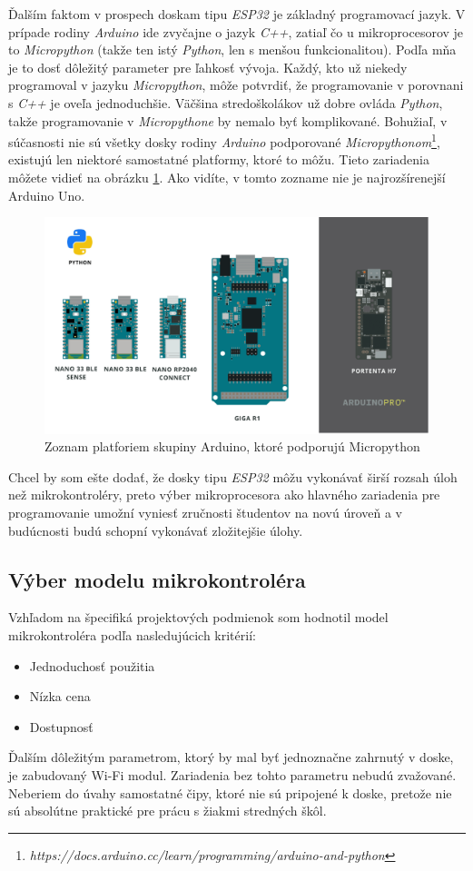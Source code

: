 Ďalším faktom v prospech doskam tipu \textit{ESP32} je základný programovací jazyk. V prípade rodiny \textit{Arduino} ide zvyčajne o jazyk \textit{C++}, zatiaľ čo u mikroprocesorov je to \textit{Micropython} (takže ten istý \textit{Python}, len s menšou funkcionalitou). Podľa mňa je to dosť dôležitý parameter pre ľahkosť vývoja. Každý, kto už niekedy programoval v jazyku \textit{Micropython}, môže potvrdiť, že programovanie v porovnani s \textit{C++} je oveľa jednoduchšie. Väčšina stredoškolákov už dobre ovláda \textit{Python}, takže programovanie v \textit{Micropythone} by nemalo byť komplikované. Bohužiaľ, v súčasnosti nie sú všetky dosky rodiny \textit{Arduino} podporované \textit{Micropythonom}\footnote{\textit{https://docs.arduino.cc/learn/programming/arduino-and-python}}, existujú len niektoré samostatné platformy, ktoré to môžu. Tieto zariadenia môžete vidieť na obrázku \ref{arduino}. Ako vidíte, v tomto zozname nie je najrozšírenejší Arduino Uno.
\begin{figure}[!ht]
    \centering
    \includegraphics[width=.9\textwidth]{figures/arduino.png}
    \caption{Zoznam platforiem skupiny Arduino, ktoré podporujú Micropython \label{arduino}\cite{arduinoPyt}}
\end{figure}

Chcel by som ešte dodať, že dosky tipu \textit{ESP32} môžu vykonávať širší rozsah úloh než mikrokontroléry, preto výber mikroprocesora ako hlavného zariadenia pre programovanie umožní vyniesť zručnosti študentov na novú úroveň a v budúcnosti budú schopní vykonávať zložitejšie úlohy.



\subsection{Výber modelu mikrokontroléra}
Vzhľadom na špecifiká projektových podmienok som hodnotil model mikrokontroléra podľa nasledujúcich kritérií:
\begin{itemize}
    \item Jednoduchosť použitia
    \item Nízka cena
    \item Dostupnosť
\end{itemize}
Ďalším dôležitým parametrom, ktorý by mal byť jednoznačne zahrnutý v doske, je zabudovaný Wi-Fi modul. Zariadenia bez tohto parametru nebudú zvažované. Neberiem do úvahy samostatné čipy, ktoré nie sú pripojené k doske, pretože nie sú absolútne praktické pre prácu s žiakmi stredných škôl.

